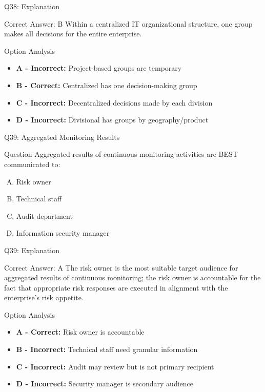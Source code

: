 \documentclass{beamer}
\begin{document}
	\begin{frame}{Q38: Explanation}
		\begin{block}{Correct Answer: B}
			Within a centralized IT organizational structure, one group makes all decisions for the entire enterprise.
		\end{block}
		\begin{block}{Option Analysis}
			\begin{itemize}
				\item \textbf{A - Incorrect:} Project-based groups are temporary
				\item \textbf{B - Correct:} Centralized has one decision-making group
				\item \textbf{C - Incorrect:} Decentralized decisions made by each division
				\item \textbf{D - Incorrect:} Divisional has groups by geography/product
			\end{itemize}
		\end{block}
	\end{frame}
	
	\begin{frame}{Q39: Aggregated Monitoring Results}
		\begin{block}{Question}
			Aggregated results of continuous monitoring activities are BEST communicated to:
		\end{block}
		\begin{enumerate}[(A)]
			\item Risk owner
			\item Technical staff
			\item Audit department
			\item Information security manager
		\end{enumerate}
	\end{frame}
	
	\begin{frame}{Q39: Explanation}
		\begin{block}{Correct Answer: A}
			The risk owner is the most suitable target audience for aggregated results of continuous monitoring; the risk owner is accountable for the fact that appropriate risk responses are executed in alignment with the enterprise's risk appetite.
		\end{block}
		\begin{block}{Option Analysis}
			\begin{itemize}
				\item \textbf{A - Correct:} Risk owner is accountable
				\item \textbf{B - Incorrect:} Technical staff need granular information
				\item \textbf{C - Incorrect:} Audit may review but is not primary recipient
				\item \textbf{D - Incorrect:} Security manager is secondary audience
			\end{itemize}
		\end{block}
	\end{frame}
	
\end{document}

